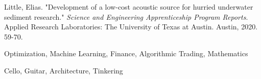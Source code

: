 Little, Elias. "Development of a low-cost acoustic source for hurried underwater sediment research."
\textit{Science and Engineering Apprenticeship Program Reports}. Applied Research Laboratories: The University of Texas at Austin.
Austin, 2020. 59-70.

Optimization, Machine Learning, Finance, Algorithmic Trading, Mathematics

Cello, Guitar, Architecture, Tinkering


\medskip
